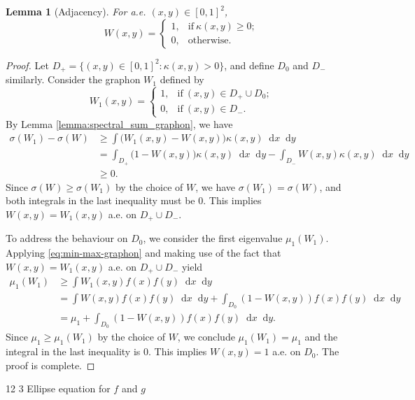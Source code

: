 \documentclass[11pt]{article}
\makeatletter
\renewcommand\subsection{\@startsection{subsection}{2}{\z@}%
{12\p@ \@plus 6\p@ \@minus 3\p@}%
{3\p@ \@plus 6\p@ \@minus 3\p@}%
{\bfseries\boldmath}}
\theoremstyle{plain}
\newtheorem{lemma}[theorem]{Lemma}
\theoremstyle{definition}
\numberwithin{equation}{section}
\newcommand{\dif}{\mathop{}\!\mathrm{d}}
\makeatother
\begin{document}
\begin{lemma}[Adjacency]\label{lemma:adjacency} 
For a.e. $(x,y)\in [0,1]^2$, 
\[
W(x,y) = 
\begin{cases}
1, & \text{if}\ \kappa(x,y) \geq 0; \\
0, & \text{otherwise}.
\end{cases}
\]
\end{lemma}

\begin{proof}
Let $D_+ = \{(x,y)\in [0,1]^2: \kappa(x,y) > 0\}$, and define $D_0$ and $D_-$ similarly. 
Consider the graphon $W_1$ defined by 
\[
W_1(x,y) = 
\begin{cases}
1, & \text{if}\ (x,y)\in D_+\cup D_0;\\ 
0, & \text{if}\ (x,y)\in D_-.
\end{cases}
\]
By Lemma \ref{lemma:spectral_sum_graphon}, we have
\begin{align*}
\sigma (W_1) - \sigma(W)  
& \geq \int \big(W_1(x,y) - W(x,y)\big) \kappa(x,y) \dif{x}\dif{y} \\
& = \int_{D_+} \big(1 - W(x,y)\big) \kappa(x,y) \dif{x}\dif{y} - \int_{D_-} W(x,y)\kappa(x,y) \dif{x}\dif{y} \\
& \geq 0.
\end{align*}
Since $\sigma (W) \geq \sigma (W_1)$ by the choice of $W$, we have $\sigma(W_1) = \sigma(W)$, 
and both integrals in the last inequality must be $0$. This implies $W(x,y) = W_1(x,y)$ a.e. on $D_+\cup D_-$.

To address the behaviour on $D_0$, we consider the first eigenvalue $\mu_1(W_1)$. 
Applying \eqref{eq:min-max-graphon} and making use of the fact that $W(x,y) = W_1(x,y)$ a.e. on $D_+\cup D_-$ yield
\begin{align*}
  \mu_1(W_1) & \geq \int W_1(x,y)f(x)f(y)\dif{x}\dif{y} \\
  & = \int W(x,y)f(x)f(y)\dif{x}\dif{y} + \int_{D_0} \left(1 - W(x,y)\right)f(x)f(y)\dif{x}\dif{y} \\
  & = \mu_1 + \int_{D_0} \left(1 - W(x,y)\right)f(x)f(y)\dif{x}\dif{y}.
\end{align*}
Since $\mu_1\ge \mu_1(W_1)$ by the choice of $W$, we conclude $\mu_1(W_1) = \mu_1$ 
and the integral in the last inequality is 0. This implies $W(x,y)=1$ a.e. on $D_0$. The proof is complete.
\end{proof}

\subsection{Ellipse equation for $f$ and $g$}
\end{document}
